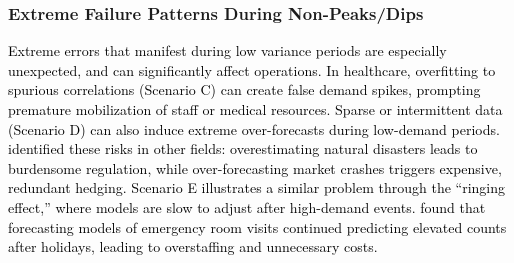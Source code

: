 \documentclass[12pt]{article}
\newcommand{\matt}[1]{\textcolor{black}{#1}}
\begin{document}


\subsubsection{Extreme Failure Patterns During Non-Peaks/Dips}
\matt{Extreme errors that manifest during low variance periods are especially unexpected, and can significantly affect operations. In healthcare, overfitting to spurious correlations (Scenario C) can create false demand spikes, prompting premature mobilization of staff or medical resources. Sparse or intermittent data (Scenario D) can also induce extreme over-forecasts during low-demand periods. %
\citet{nikolopoulos2021} identified these risks in other fields: overestimating natural disasters leads to burdensome regulation, while over-forecasting market crashes triggers expensive, redundant hedging. Scenario E illustrates a similar problem through the “ringing effect,” where models %
are slow to adjust after high-demand events. \citet{Burkom2007} found that forecasting models of emergency room visits continued predicting elevated counts after holidays, leading to overstaffing and unnecessary costs.}
\end{document}
